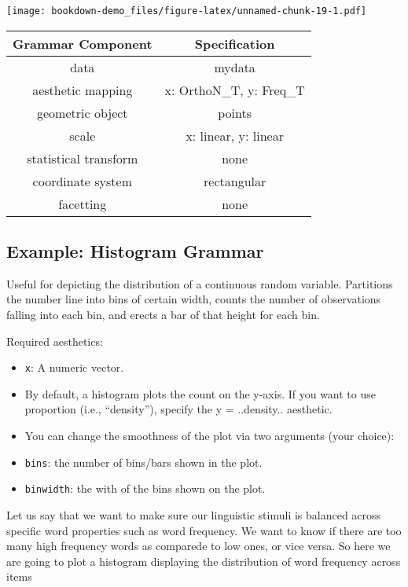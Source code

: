 \documentclass[]{book}
\begin{document}
\texttt{[image: bookdown-demo\_files/figure-latex/unnamed-chunk-19-1.pdf]}

\begin{longtable}[]{@{}cc@{}}
\toprule
Grammar Component & Specification\tabularnewline
\midrule
\endhead
data & mydata\tabularnewline
aesthetic mapping & x: OrthoN\_T, y: Freq\_T\tabularnewline
geometric object & points\tabularnewline
scale & x: linear, y: linear\tabularnewline
statistical transform & none\tabularnewline
coordinate system & rectangular\tabularnewline
facetting & none\tabularnewline
\bottomrule
\end{longtable}

\subsection{Example: Histogram Grammar}\label{example-histogram-grammar}

Useful for depicting the distribution of a continuous random variable.
Partitions the number line into bins of certain width, counts the number
of observations falling into each bin, and erects a bar of that height
for each bin.

Required aesthetics:

\begin{itemize}
\item
  \texttt{x}: A numeric vector.
\item
  By default, a histogram plots the count on the y-axis. If you want to
  use proportion (i.e., ``density''), specify the y = ..density..
  aesthetic.
\item
  You can change the smoothness of the plot via two arguments (your
  choice):
\item
  \texttt{bins}: the number of bins/bars shown in the plot.
\item
  \texttt{binwidth}: the with of the bins shown on the plot.
\end{itemize}

Let us say that we want to make sure our linguistic stimuli is balanced
across specific word properties such as word frequency. We want to know
if there are too many high frequency words as comparede to low ones, or
vice versa. So here we are going to plot a histogram displaying the
distribution of word frequency across items
\end{document}
